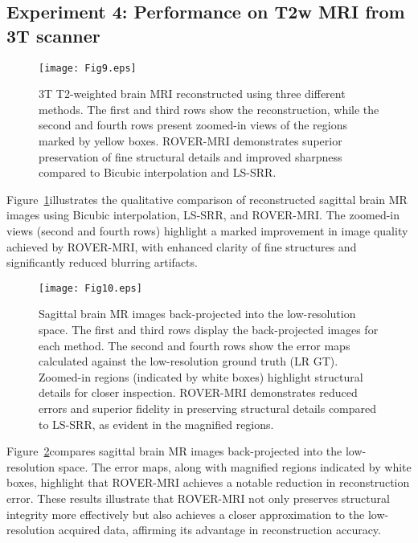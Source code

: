 \documentclass[AMA,STIX2COL]{MRM}
\begin{document}
\subsection{Experiment 4: Performance on T2w MRI from 3T scanner}
\begin{figure}[t]
\centerline{\texttt{[image: Fig9.eps]}}
\caption{3T T2-weighted brain MRI reconstructed using three different methods. The first and third rows show the reconstruction, while the second and fourth rows present zoomed-in views of the regions marked by yellow boxes. ROVER-MRI demonstrates superior preservation of fine structural details and improved sharpness compared to Bicubic interpolation and LS-SRR.}\label{fig9}
\end{figure}
%
Figure~\ref{fig9}illustrates the qualitative comparison of reconstructed sagittal brain MR images using Bicubic interpolation, LS-SRR, and ROVER-MRI. The zoomed-in views (second and fourth rows) highlight a marked improvement in image quality achieved by ROVER-MRI, with enhanced clarity of fine structures and significantly reduced blurring artifacts. %

\begin{figure}[t]
\centerline{\texttt{[image: Fig10.eps]}}
\caption{Sagittal brain MR images back-projected into the low-resolution space. The first and third rows display the back-projected images for each method. The second and fourth rows show the error maps calculated against the low-resolution ground truth (LR GT). Zoomed-in regions (indicated by white boxes) highlight structural details for closer inspection. ROVER-MRI demonstrates reduced errors and superior fidelity in preserving structural details compared to LS-SRR, as evident in the magnified regions.}\label{fig10}
\end{figure}
%
Figure~\ref{fig10}compares sagittal brain MR images back-projected into the low-resolution space. The error maps, along with magnified regions indicated by white boxes, highlight that ROVER-MRI achieves a notable reduction in reconstruction error. These results illustrate that ROVER-MRI not only preserves structural integrity more effectively but also achieves a closer approximation to the low-resolution acquired data, affirming its advantage in reconstruction accuracy.
\end{document}

